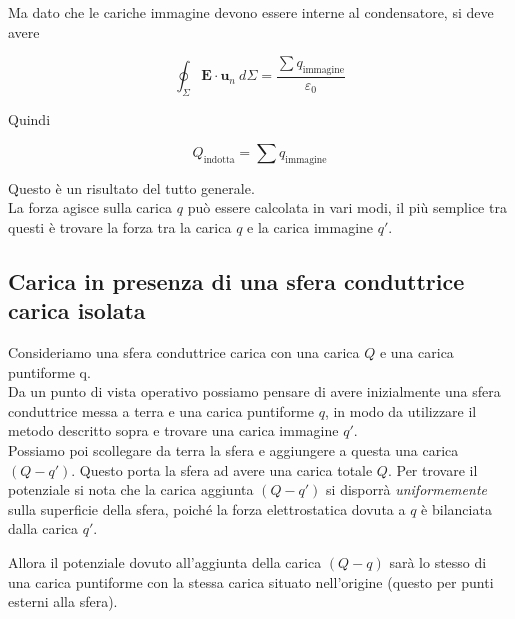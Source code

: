 Ma dato che le cariche immagine devono essere interne al condensatore, si deve avere 

\begin{equation*}
    \oint_{\Sigma} \mathbf{E} \cdot \mathbf{u}_n \ d\Sigma = \frac{\sum q_{\text{immagine}}}{\varepsilon_0}   
\end{equation*}

Quindi 

\begin{tcolorbox}[colback=yellow!10!white, colframe=orange!70!black, boxrule=0.8pt]
\begin{equation}
    Q_{\text{indotta}} = \sum q_{\text{immagine}} 
\end{equation}
\end{tcolorbox}

Questo è un risultato del tutto generale. \\

La forza agisce sulla carica $q$ può essere calcolata in vari modi, il più semplice tra questi è trovare la forza tra la carica $q$ e la carica immagine $q'$.

\subsection{Carica in presenza di una sfera conduttrice carica isolata}

Consideriamo una sfera conduttrice carica con una carica $Q$ e una carica puntiforme q.\\

Da un punto di vista operativo possiamo pensare di avere inizialmente una sfera conduttrice messa a terra e una carica puntiforme $q$, in modo da utilizzare il metodo descritto sopra e trovare una carica immagine $q'$. \\

Possiamo poi scollegare da terra la sfera e aggiungere a questa una carica $(Q-q')$. Questo porta la sfera ad avere una carica totale $Q$. Per trovare il potenziale si nota che la carica aggiunta $(Q-q')$ si disporrà \emph{uniformemente} sulla superficie della sfera, poiché la forza elettrostatica dovuta a $q$ è bilanciata dalla carica $q'$. \\

\newpage

Allora il potenziale dovuto all'aggiunta della carica $(Q - q)$ sarà lo stesso di una carica puntiforme con la stessa carica situato nell'origine (questo per punti esterni alla sfera).

